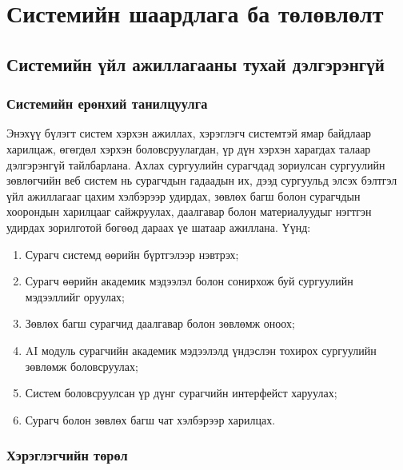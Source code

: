 
\chapter{Системийн шаардлага ба төлөвлөлт} %
\label{Chapter2} %

\section{Системийн үйл ажиллагааны тухай дэлгэрэнгүй}

\subsection*{Системийн ерөнхий танилцуулга}
Энэхүү бүлэгт систем хэрхэн ажиллах, хэрэглэгч системтэй ямар
байдлаар харилцаж, өгөгдөл хэрхэн боловсруулагдан, үр дүн хэрхэн
харагдах талаар дэлгэрэнгүй тайлбарлана. Ахлах сургуулийн
сурагчдад зориулсан сургуулийн зөвлөгчийн веб систем нь сурагчдын
гадаадын их, дээд сургуульд элсэх бэлтгэл үйл ажиллагааг цахим
хэлбэрээр удирдах, зөвлөх багш болон сурагчдын хоорондын
харилцааг сайжруулах, даалгавар болон материалуудыг нэгтгэн
удирдах зорилготой бөгөөд дараах үе шатаар ажиллана. Үүнд:

\begin{enumerate}
    \item Сурагч системд өөрийн бүртгэлээр нэвтрэх;
    
    \item Сурагч өөрийн академик мэдээлэл болон сонирхож буй
    сургуулийн мэдээллийг оруулах;
    
    \item Зөвлөх багш сурагчид даалгавар болон зөвлөмж оноох;
    
    \item AI модуль сурагчийн академик мэдээлэлд үндэслэн
    тохирох сургуулийн зөвлөмж боловсруулах;
    
    \item Систем боловсруулсан үр дүнг сурагчийн интерфейст
    харуулах;
    
    \item Сурагч болон зөвлөх багш чат хэлбэрээр харилцах.
\end{enumerate}

\subsection*{Хэрэглэгчийн төрөл}

